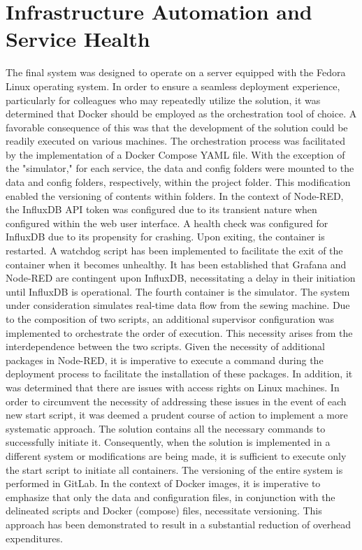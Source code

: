\section{Infrastructure Automation and Service Health}
The final system was designed to operate on a server equipped with the Fedora Linux operating system. In order to ensure a seamless deployment experience, particularly for colleagues who may repeatedly utilize the solution, it was determined that Docker should be employed as the orchestration tool of choice. A favorable consequence of this was that the development of the solution could be readily executed on various machines. The orchestration process was facilitated by the implementation of a Docker Compose YAML file. With the exception of the "simulator," for each service, the data and config folders were mounted to the data and config folders, respectively, within the project folder. This modification enabled the versioning of contents within folders. In the context of Node-RED, the InfluxDB API token was configured due to its transient nature when configured within the web user interface. A health check was configured for InfluxDB due to its propensity for crashing. Upon exiting, the container is restarted. A watchdog script has been implemented to facilitate the exit of the container when it becomes unhealthy. It has been established that Grafana and Node-RED are contingent upon InfluxDB, necessitating a delay in their initiation until InfluxDB is operational. The fourth container is the simulator. The system under consideration simulates real-time data flow from the sewing machine. Due to the composition of two scripts, an additional supervisor configuration was implemented to orchestrate the order of execution. This necessity arises from the interdependence between the two scripts.
Given the necessity of additional packages in Node-RED, it is imperative to execute a command during the deployment process to facilitate the installation of these packages. In addition, it was determined that there are issues with access rights on Linux machines. In order to circumvent the necessity of addressing these issues in the event of each new start script, it was deemed a prudent course of action to implement a more systematic approach. The solution contains all the necessary commands to successfully initiate it. Consequently, when the solution is implemented in a different system or modifications are being made, it is sufficient to execute only the start script to initiate all containers.
The versioning of the entire system is performed in GitLab. In the context of Docker images, it is imperative to emphasize that only the data and configuration files, in conjunction with the delineated scripts and Docker (compose) files, necessitate versioning. This approach has been demonstrated to result in a substantial reduction of overhead expenditures.

